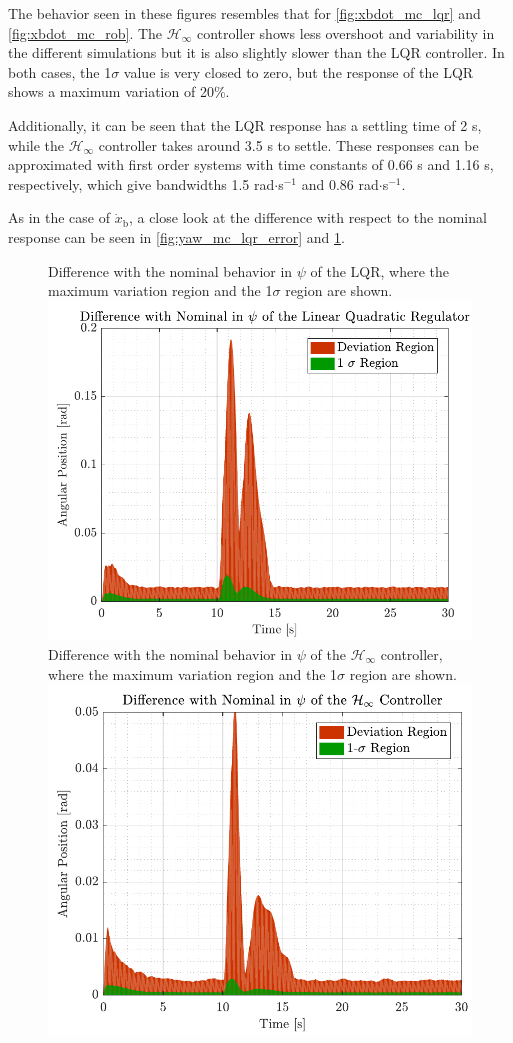 The behavior seen in these figures resembles that for \autoref{fig:xbdot_mc_lqr} and \ref{fig:xbdot_mc_rob}. The $\mathcal{H}_\infty$ controller shows less overshoot and variability in the different simulations but it is also slightly slower than the LQR controller. In both cases, the 1$\sigma$ value is very closed to zero, but the response of the LQR shows a maximum variation of 20\%.

Additionally, it can be seen that the LQR response has a settling time of 2 s, while the $\mathcal{H}_\infty$ controller takes around \num{3.5} s to settle. These responses can be approximated with first order systems with time constants of \num{0.66} s and \num{1.16} s, respectively, which give bandwidths \num{1.5} rad$\cdot$s$^{-1}$ and \num{0.86} rad$\cdot$s$^{-1}$.

As in the case of $\dot{x}_\mathrm{b}$, a close look at the difference with respect to the nominal response can be seen in \autoref{fig:yaw_mc_lqr_error} and \ref{fig:yaw_mc_rob_error}.
\begin{figure}[H]
    \captionbox 
    {   
        Difference with the nominal behavior in $\psi$ of the LQR, where the maximum variation region and the 1$\sigma$ region are shown.
        \label{fig:yaw_mc_lqr_error}
    }                                                                 
    {                                                                  
        \includegraphics[width=.45\textwidth]{figures/yaw_mc_lqr_error}         
    }                                                                    
    \hspace{5pt}                                                          
    \captionbox  
    {   
        Difference with the nominal behavior in $\psi$ of the $\mathcal{H}_\infty$ controller, where the maximum variation region and the 1$\sigma$ region are shown.   
        \label{fig:yaw_mc_rob_error}
    }                                                                          
    {
        \includegraphics[width=.45\textwidth]{figures/yaw_mc_rob_error}
    }
\end{figure}

